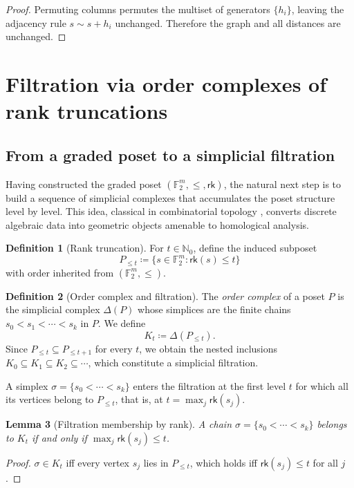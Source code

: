 \documentclass[11pt,twoside,leqno]{article}
\theoremstyle{definition}
\newtheorem{definition}{Definition}[section]
\theoremstyle{plain}
\newtheorem{lemma}[definition]{Lemma}
\theoremstyle{remark}
\newcommand{\N}{\mathbb{N}}
\newcommand{\Ftwo}{\mathbb{F}_2}
\newcommand{\rk}{\mathsf{rk}}
\begin{document}
\begin{proof}
Permuting columns permutes the multiset of generators $\{h_i\}$, leaving the adjacency rule $s\sim s+h_i$ unchanged.
Therefore the graph and all distances are unchanged.
\end{proof}

\section{Filtration via order complexes of rank truncations}\label{sec:filtration}

\subsection{From a graded poset to a simplicial filtration}

Having constructed the graded poset $(\Ftwo^m, \le, \rk)$, the natural next step is to build a
sequence of simplicial complexes that accumulates the poset structure level by level. This idea,
classical in combinatorial topology \cite{BjornerTopMeth,WachsPosetTopology}, converts discrete
algebraic data into geometric objects amenable to homological analysis.

\begin{definition}[Rank truncation]\label{def:ranktrunc}
For $t\in\N_0$, define the induced subposet
\[
P_{\le t}\coloneqq\{s\in\Ftwo^m:\rk(s)\le t\}
\]
with order inherited from $(\Ftwo^m,\le)$.
\end{definition}

\begin{definition}[Order complex and filtration]\label{def:ordercomplex}
The \emph{order complex} of a poset $P$ is the simplicial complex $\Delta(P)$ whose simplices are
the finite chains $s_0<s_1<\cdots<s_k$ in $P$. We define
\[
K_t\coloneqq \Delta(P_{\le t}).
\]
Since $P_{\le t}\subseteq P_{\le t+1}$ for every $t$, we obtain the nested inclusions
$K_0\subseteq K_1\subseteq K_2\subseteq\cdots$, which constitute a simplicial filtration.
\end{definition}

A simplex $\sigma=\{s_0<\cdots<s_k\}$ enters the filtration at the first level $t$ for which all
its vertices belong to $P_{\le t}$, that is, at $t=\max_j\rk(s_j)$.

\begin{lemma}[Filtration membership by rank]\label{lem:filt}
A chain $\sigma=\{s_0<\cdots<s_k\}$ belongs to $K_t$ if and only if $\max_j\rk(s_j)\le t$.
\end{lemma}
\begin{proof}
$\sigma\in K_t$ iff every vertex $s_j$ lies in $P_{\le t}$, which holds iff $\rk(s_j)\le t$ for all $j$.
\end{proof}
\end{document}
